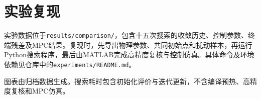 \section{实验复现}
实验数据位于\texttt{results/comparison/}，包含十五次搜索的收敛历史、控制参数、终端残差及MPC结果。复现时，先导出物理参数、共同初始点和扰动样本，再运行Python搜索程序，最后由MATLAB完成高精度复核与控制仿真。具体命令及环境依赖见仓库中的\nolinkurl{experiments/README.md}。

图表由归档数据生成。搜索耗时包含初始化评价与迭代更新，不含编译预热、高精度复核和MPC仿真。
